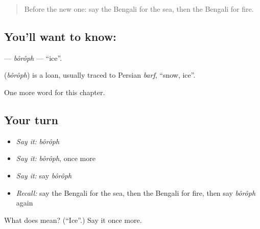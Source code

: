 \label{lesson:BN-C67-boroph}



\begin{quote}
Before the new one: say the Bengali for the sea, then the Bengali for fire.
\end{quote}

\subsection*{You'll want to know: }
\textbf{} — \emph{bôrôph} — \textquotedblleft{}ice\textquotedblright{}.

\begin{cousinweb}
\textbf{} (\emph{bôrôph}) is a loan, usually traced to Persian \emph{barf}, \textquotedblleft{}snow, ice\textquotedblright{}.
\end{cousinweb}

\begin{grammarlens}[title={What you've built}]
One more word for this chapter.
\end{grammarlens}

\subsection*{Your turn}
\begin{itemize}
\raggedright
  \item \emph{Say it:} \emph{bôrôph}
  \item \emph{Say it:} \emph{bôrôph}, once more
  \item \emph{Say it:} say \emph{bôrôph}
  \item \emph{Recall:} say the Bengali for the sea, then the Bengali for fire, then say \emph{bôrôph} again
\end{itemize}

\begin{tcolorbox}[breakable,colback=teal!4,colframe=teal!35!black,title={Before you move on}]
What does  mean? (\textquotedblleft{}Ice\textquotedblright{}.) Say it once more.
\end{tcolorbox}
